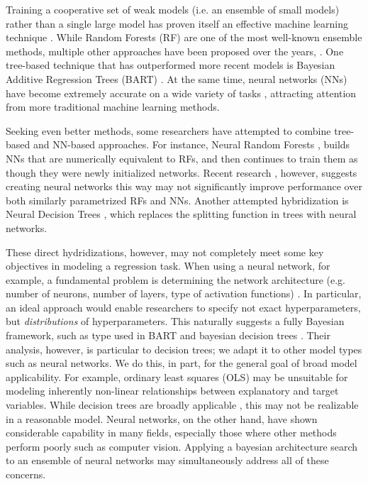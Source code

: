 \documentclass[12pt]{article}
\begin{document}
Training a cooperative set of weak models (i.e. an ensemble of small models) rather than a single large model has proven itself an effective machine learning technique \cite{dietterich2000ensemble,hansen1990neural,seni2010ensemble,lee2020comparing}.  While Random Forests (RF) \cite{ho1995random,breiman2001random} are one of the most well-known ensemble methods, multiple other approaches have been proposed over the years, \cite[provide some reviews]{way2012advances,dong2020survey}.  One tree-based technique that has outperformed more recent models \cite{biau2019neural} is Bayesian Additive Regression Trees (BART) \cite{chipman2010bart}.  At the same time, neural networks (NNs) have become extremely accurate on a wide variety of tasks \cite{schmidhuber2015deep}, attracting attention from more traditional machine learning methods.

Seeking even better methods, some researchers have attempted to combine tree-based and NN-based approaches.  For instance, Neural Random Forests \cite{biau2019neural}, builds NNs that are numerically equivalent to RFs, and then continues to train them as though they were newly initialized networks.  Recent research \cite{vanboxel2021neural}, however, suggests creating neural networks this way may not significantly improve performance over both similarly parametrized RFs and NNs.  Another attempted hybridization is Neural Decision Trees \cite{balestriero2017neural}, which replaces the splitting function in trees with neural networks.

These direct hydridizations, however, may not completely meet some key objectives in modeling a regression task.  When using a neural network, for example, a fundamental problem is determining the network architecture (e.g. number of neurons, number of layers, type of activation functions) \cite{elsken2019neural}.  In particular, an ideal approach would enable researchers to specify not exact hyperparameters, but \emph{distributions} of hyperparameters.  This naturally suggests a fully Bayesian framework, such as type used in BART and bayesian decision trees \cite{chipman1998bayesian}.  Their analysis, however, is particular to decision trees; we adapt it to other model types such as neural networks.  We do this, in part, for the general goal of broad model applicability.  For example, ordinary least squares (OLS) may be unsuitable for modeling inherently non-linear relationships between explanatory and target variables.  While decision trees are broadly applicable \cite{breiman1984classification}, this may not be realizable in a reasonable model.  Neural networks, on the other hand, have shown considerable capability in many fields, especially those where other methods perform poorly \cite{schmidhuber2015deep} such as computer vision.  Applying a bayesian architecture search to an ensemble of neural networks may simultaneously address all of these concerns.
\end{document}
